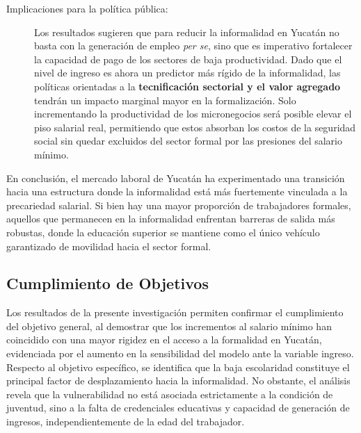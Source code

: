 \begin{description}
   \item[Implicaciones para la política pública:] Los resultados sugieren que para reducir la informalidad en Yucatán no basta con la generación de empleo \textit{per se}, sino que es imperativo fortalecer la capacidad de pago de los sectores de baja productividad. Dado que el nivel de ingreso es ahora un predictor más rígido de la informalidad, las políticas orientadas a la \textbf{tecnificación sectorial y el valor agregado} tendrán un impacto marginal mayor en la formalización. Solo incrementando la productividad de los micronegocios será posible elevar el piso salarial real, permitiendo que estos absorban los costos de la seguridad social sin quedar excluidos del sector formal por las presiones del salario mínimo.
\end{description}

\vspace{1em}
\noindent En conclusión, el mercado laboral de Yucatán ha experimentado una transición hacia una estructura donde la informalidad está más fuertemente vinculada a la precariedad salarial. Si bien hay una mayor proporción de trabajadores formales, aquellos que permanecen en la informalidad enfrentan barreras de salida más robustas, donde la educación superior se mantiene como el único vehículo garantizado de movilidad hacia el sector formal.

\subsection{Cumplimiento de Objetivos}
Los resultados de la presente investigación permiten confirmar el cumplimiento del objetivo general, al demostrar que los incrementos al salario mínimo han coincidido con una mayor rigidez en el acceso a la formalidad en Yucatán, evidenciada por el aumento en la sensibilidad del modelo ante la variable ingreso. Respecto al objetivo específico, se identifica que la baja escolaridad constituye el principal factor de desplazamiento hacia la informalidad. No obstante, el análisis revela que la vulnerabilidad no está asociada estrictamente a la condición de juventud, sino a la falta de credenciales educativas y capacidad de generación de ingresos, independientemente de la edad del trabajador.
